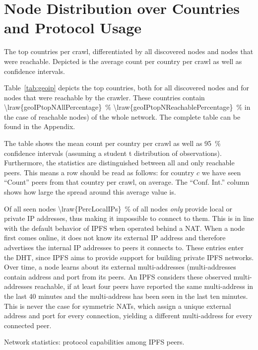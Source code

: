 \documentclass[10pt]{article}
\begin{document}
\section{Node Distribution over Countries and Protocol Usage}
\label{sec:eval_country_distribution}
%
\begin{table}[htb]

\caption{The top  countries per crawl, differentiated by all discovered nodes and nodes that were reachable. Depicted is the average count per country per crawl as well as confidence intervals.}
\label{tab:geoip}
\end{table}
%

Table~\ref{tab:geoip} depicts the top  countries, both for all discovered nodes and for nodes that were reachable by the crawler.
These  countries contain \SI{\lraw{geoIPtopNAllPercentage}}{\percent} \SI{\lraw{geoIPtopNReachablePercentage}}{\percent} in the case of reachable nodes) of the whole network.
The complete table can be found in the Appendix.

The table shows the mean count per country per crawl as well as \SI{95}{\percent} confidence intervals (assuming a student t distribution of observations).
Furthermore, the statistics are distinguished between all and only reachable peers.
This means a row should be read as follows: for country $c$ we have seen ``Count'' peers from that country per crawl, on average.
The ``Conf. Int.'' column shows how large the spread around this average value is.

Of all seen nodes \SI{\lraw{PercLocalIPs}}{\percent} of all nodes \emph{only} provide local or private IP addresses, thus making it impossible to connect to them.
This is in line with the default behavior of IPFS when operated behind a NAT.
When a node first comes online, it does not know its external IP address and therefore advertises the internal IP addresses to peers it connects to.
These entries enter the DHT, since IPFS aims to provide support for building private IPFS networks.
Over time, a node learns about its external multi-addresses (multi-addresses contain address and port from its peers.
An IPFS considers these observed multi-addresses reachable, if at least four peers have reported the same multi-address in the last 40 minutes and the multi-address has been seen in the last ten minutes.
This is never the case for symmetric NATs, which assign a unique external address and port for every connection, yielding a different multi-address for every connected peer.
%
\begin{table}[htb]
  \center
  
  \caption{Network statistics: protocol capabilities among IPFS peers.}
  \label{tab:protocols}
\end{table}
%
\end{document}

